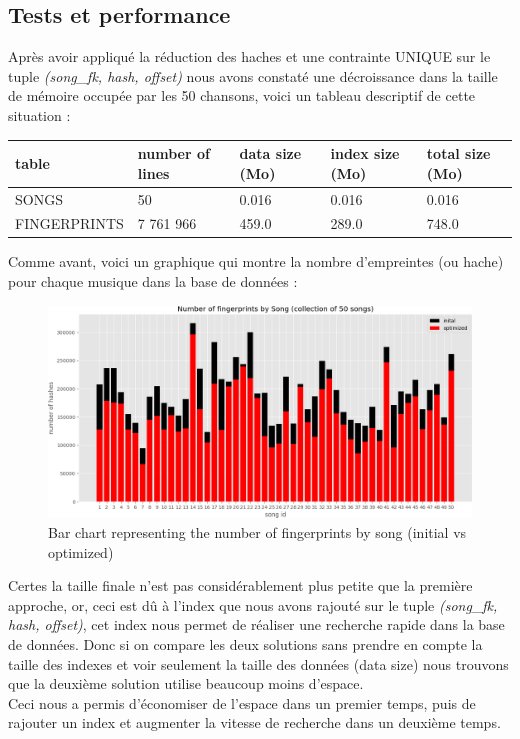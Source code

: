 \documentclass[11pt, report, french]{scrreprt}
\begin{document}
\newpage
\subsection{Tests et performance}
Après avoir appliqué la réduction des haches et une contrainte UNIQUE sur le tuple \textit{(song\_fk, hash, offset)} nous avons constaté une décroissance dans la taille de mémoire occupée par les 50 chansons, voici un tableau descriptif de cette situation :

\begin{center}
	\begin{tabular}{ | m{3.5cm} || m{3cm}| m{3cm} | m{3cm} | m{3cm} | } 
		\hline
		table & number of lines & data size (Mo) & index size (Mo) & total size (Mo) \\ 
		\hline
		\hline
		SONGS & 50 & 0.016 & 0.016 & 0.016 \\ 
		\hline
		FINGERPRINTS & 7 761 966 & 459.0 & 289.0 & 748.0 \\ 
		\hline
	\end{tabular}
\end{center}


Comme avant, voici un graphique qui montre la nombre d'empreintes (ou hache) pour chaque musique dans la base de données : 

\begin{figure}[H]
	\centering
	\includegraphics[scale=0.55]{img/histogram2.png}
	\caption{Bar chart representing the number of fingerprints by song (initial vs optimized)}
\end{figure}

Certes la taille finale n'est pas considérablement plus petite que la première approche, or, ceci est dû à l'index que nous avons rajouté sur le tuple \textit{(song\_fk, hash, offset)}, cet index nous permet de réaliser une recherche rapide dans la base de données. Donc si on compare les deux solutions sans prendre en compte la taille des indexes et voir seulement la taille des données (data size) nous trouvons que la deuxième solution utilise beaucoup moins d'espace.\\
Ceci nous a permis d'économiser de l'espace dans un premier temps, puis de rajouter un index et augmenter la vitesse de recherche dans un deuxième temps.\\
\end{document}
